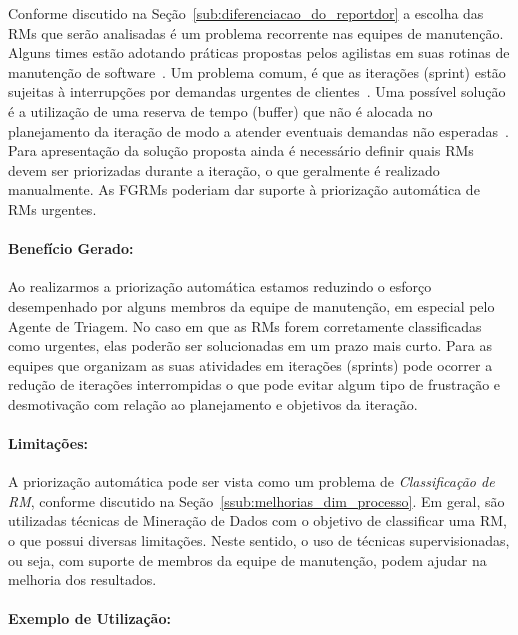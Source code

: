 Conforme discutido na Seção~\ref{sub:diferenciacao_do_reportdor} a escolha das
RMs que serão analisadas é um problema recorrente nas equipes de manutenção.
Alguns times estão adotando práticas propostas pelos agilistas em suas rotinas
de manutenção de software~\cite{svensson2005introducing}. Um problema comum, é
que as iterações (sprint) estão sujeitas à interrupções por demandas urgentes de
clientes~\cite{bennett2000software}. Uma possível solução é a utilização de uma
reserva de tempo (buffer) que não é alocada no planejamento da iteração de modo
a atender eventuais demandas não esperadas~\cite{schwaber2002agile}. Para
apresentação da solução proposta ainda é necessário definir quais RMs devem ser
priorizadas durante a iteração, o que geralmente é realizado manualmente. As
FGRMs poderiam dar suporte à priorização automática de RMs urgentes.

\paragraph{Benefício Gerado:}
\label{par:papéis_afetados_s07}

Ao realizarmos a priorização automática estamos reduzindo o esforço desempenhado
por alguns membros da equipe de manutenção, em especial pelo Agente de Triagem.
No caso em que as RMs forem corretamente classificadas como urgentes, elas
poderão ser solucionadas em um prazo mais curto. Para as equipes que organizam
as suas atividades em iterações (sprints) pode ocorrer a redução de iterações
interrompidas o que pode evitar algum tipo de frustração e desmotivação com
relação ao planejamento e objetivos da iteração.

\paragraph{Limitações:}
\label{par:limitacoes_s07}

A priorização automática pode ser vista como um problema de
\textit{Classificação de RM}, conforme discutido na
Seção~\ref{ssub:melhorias_dim_processo}. Em geral, são utilizadas técnicas de
Mineração de Dados com o objetivo de classificar uma RM, o que possui diversas
limitações. Neste sentido, o uso de técnicas supervisionadas, ou seja, com
suporte de membros da equipe de manutenção, podem ajudar na melhoria dos
resultados.

\paragraph{Exemplo de Utilização:}
\label{par:exemplo_de_utilização_s07}

